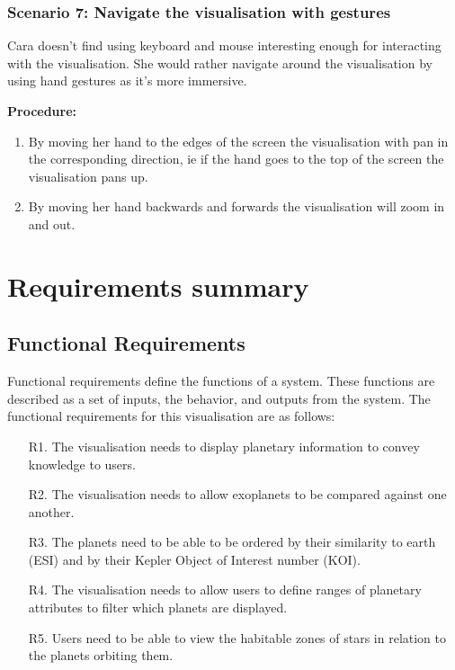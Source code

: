  \subsubsection{Scenario 7: Navigate the visualisation with gestures}
Cara doesn't find using keyboard and mouse interesting enough for interacting with the visualisation. She would rather navigate around the visualisation by using hand
gestures as it's more immersive.

  {\bf  Procedure:}
   \begin{enumerate}
 \item By moving her hand to the edges of the screen the visualisation with pan
in the corresponding direction, ie if the hand goes to the top of the screen
the visualisation pans up.
 \item By moving her hand backwards and forwards the visualisation will zoom in
and out.
  \end{enumerate}
  
  
\section{Requirements summary}
\subsection{Functional Requirements}
Functional requirements define the functions of a system. These functions are
described as a set of inputs, the behavior, and outputs from the system. The functional requirements for this visualisation are as follows:
\begin{enumerate}

 \item[R1.] The visualisation needs to display planetary information to convey knowledge to
users.

 \item[R2.] The visualisation needs to allow exoplanets to be compared against one another.

 \item[R3.] The planets need to be able to be ordered by their similarity to earth (ESI) and by their Kepler Object of Interest number (KOI).
 
 \item[R4.] The visualisation needs to allow users to define ranges of planetary attributes to filter which planets are displayed.

 \item[R5.] Users need to be able to view the habitable zones of stars in relation to the planets orbiting them.

\end{enumerate}

